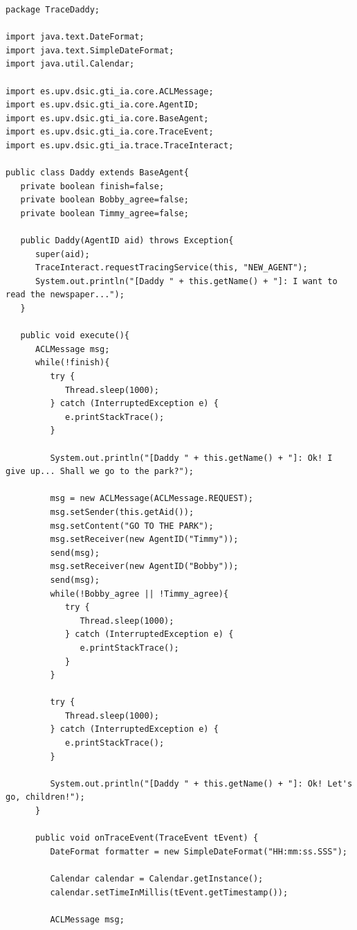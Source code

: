 		\begin{lstlisting}
package TraceDaddy;

import java.text.DateFormat;
import java.text.SimpleDateFormat;
import java.util.Calendar;

import es.upv.dsic.gti_ia.core.ACLMessage;
import es.upv.dsic.gti_ia.core.AgentID;
import es.upv.dsic.gti_ia.core.BaseAgent;
import es.upv.dsic.gti_ia.core.TraceEvent;
import es.upv.dsic.gti_ia.trace.TraceInteract;

public class Daddy extends BaseAgent{
   private boolean finish=false;
   private boolean Bobby_agree=false;
   private boolean Timmy_agree=false;

   public Daddy(AgentID aid) throws Exception{
      super(aid);
      TraceInteract.requestTracingService(this, "NEW_AGENT");
      System.out.println("[Daddy " + this.getName() + "]: I want to read the newspaper...");
   }

   public void execute(){
      ACLMessage msg;
      while(!finish){
         try {
            Thread.sleep(1000);
         } catch (InterruptedException e) {
            e.printStackTrace();
         }

         System.out.println("[Daddy " + this.getName() + "]: Ok! I give up... Shall we go to the park?");

         msg = new ACLMessage(ACLMessage.REQUEST);
         msg.setSender(this.getAid());
         msg.setContent("GO TO THE PARK");
         msg.setReceiver(new AgentID("Timmy"));
         send(msg);
         msg.setReceiver(new AgentID("Bobby"));
         send(msg);
         while(!Bobby_agree || !Timmy_agree){
            try {
               Thread.sleep(1000);
            } catch (InterruptedException e) {
               e.printStackTrace();
            }
         }

         try {
            Thread.sleep(1000);
         } catch (InterruptedException e) {
            e.printStackTrace();
         }

         System.out.println("[Daddy " + this.getName() + "]: Ok! Let's go, children!");
      }

      public void onTraceEvent(TraceEvent tEvent) {
         DateFormat formatter = new SimpleDateFormat("HH:mm:ss.SSS");

         Calendar calendar = Calendar.getInstance();
         calendar.setTimeInMillis(tEvent.getTimestamp());

         ACLMessage msg;


\end{lstlisting}
